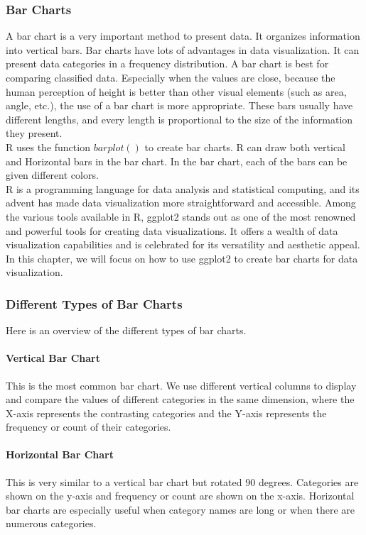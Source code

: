 \documentclass{article}\usepackage[]{graphicx}\usepackage[]{xcolor}
\begin{document}
\subsubsection{Bar Charts}
A bar chart is a very important method to present data. It organizes information into vertical bars.  Bar charts have lots of advantages in data visualization. It can present data categories in a frequency distribution. A bar chart is best for comparing classified data. Especially when the values are close, because the human perception of height is better than other visual elements (such as area, angle, etc.), the use of a bar chart is more appropriate. These bars usually have different lengths, and every length is proportional to the size of the information they present.\\
R uses the function $barplot()$ to create bar charts. R can draw both vertical and Horizontal bars in the bar chart. In the bar chart, each of the bars can be given different colors.\\
R is a programming language for data analysis and statistical computing, and its advent has made data visualization more straightforward and accessible. Among the various tools available in R, ggplot2 stands out as one of the most renowned and powerful tools for creating data visualizations. It offers a wealth of data visualization capabilities and is celebrated for its versatility and aesthetic appeal. In this chapter, we will focus on how to use ggplot2 to create bar charts for data visualization.\\

\subsubsection{Different Types of Bar Charts}
Here is an overview of the different types of bar charts. \\
\paragraph{Vertical Bar Chart}
This is the most common bar chart. We use different vertical columns to display and compare the values of different categories in the same dimension, where the X-axis represents the contrasting categories and the Y-axis represents the frequency or count of their categories.\\
\paragraph{Horizontal Bar Chart}
This is very similar to a vertical bar chart but rotated 90 degrees. Categories are shown on the y-axis and frequency or count are shown on the x-axis. Horizontal bar charts are especially useful when category names are long or when there are numerous categories.
\end{document}
